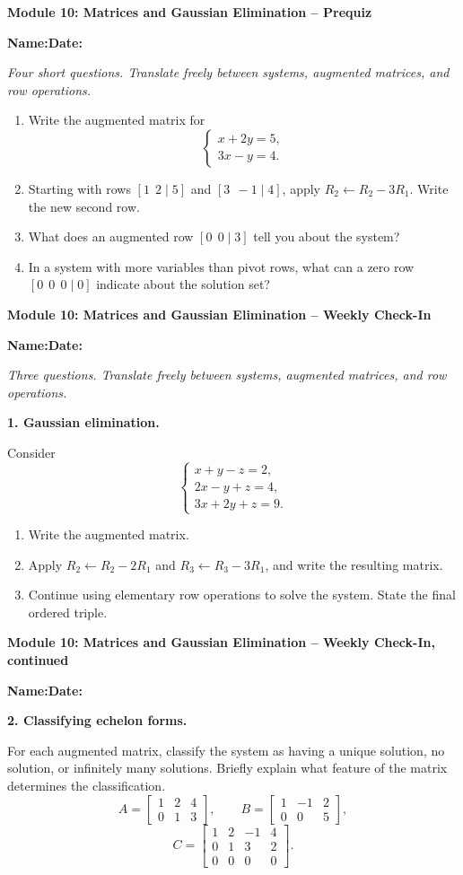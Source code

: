 \documentclass[11pt]{article}
\newcommand{\assessmenttitle}[2]{%
  {\Large\bfseries Module #1: #2}\par\vspace{3pt}
}
\newcommand{\studentline}{%
\noindent\textbf{Name:}\hspace{2.6in}\textbf{Date:}\hspace{1.15in}\par\vspace{7pt}}
\newcommand{\directions}[1]{\textit{#1}\par\vspace{4pt}}
\newcommand{\answerblank}[1]{\vspace{#1}}
\begin{document}
\assessmenttitle{10}{Matrices and Gaussian Elimination -- Prequiz}
\studentline
\directions{Four short questions. Translate freely between systems, augmented matrices, and row operations.}
\begin{enumerate}
\item Write the augmented matrix for
\[
\begin{cases}
x+2y=5,\\
3x-y=4.
\end{cases}
\]
\answerblank{0.55in}
\item Starting with rows $[1\ \ 2\mid5]$ and $[3\ \ -1\mid4]$, apply $R_2\leftarrow R_2-3R_1$. Write the new second row.
\answerblank{0.52in}
\item What does an augmented row $[0\ \ 0\mid3]$ tell you about the system?
\answerblank{0.45in}
\item In a system with more variables than pivot rows, what can a zero row $[0\ \ 0\ \ 0\mid0]$ indicate about the solution set?
\answerblank{0.52in}
\end{enumerate}
\newpage

\assessmenttitle{10}{Matrices and Gaussian Elimination -- Weekly Check-In}
\studentline
\directions{Three questions. Translate freely between systems, augmented matrices, and row operations.}
\textbf{1. Gaussian elimination.}

Consider
\[
\begin{cases}
x+y-z=2,\\
2x-y+z=4,\\
3x+2y+z=9.
\end{cases}
\]
\begin{enumerate}[label=(\alph*),leftmargin=0.35in]
\item Write the augmented matrix.
\answerblank{0.55in}
\item Apply $R_2\leftarrow R_2-2R_1$ and $R_3\leftarrow R_3-3R_1$, and write the resulting matrix.
\answerblank{0.80in}
\item Continue using elementary row operations to solve the system. State the final ordered triple.
\answerblank{1.75in}
\end{enumerate}
\newpage

\assessmenttitle{10}{Matrices and Gaussian Elimination -- Weekly Check-In, continued}
\studentline
\textbf{2. Classifying echelon forms.}

For each augmented matrix, classify the system as having a unique solution, no solution, or infinitely many solutions. Briefly explain what feature of the matrix determines the classification.
\[
A=\left[\begin{array}{cc|c}1&2&4\\0&1&3\end{array}\right],\qquad
B=\left[\begin{array}{cc|c}1&-1&2\\0&0&5\end{array}\right],
\]
\[
C=\left[\begin{array}{ccc|c}1&2&-1&4\\0&1&3&2\\0&0&0&0\end{array}\right].
\]
\answerblank{1.05in}
\end{document}

